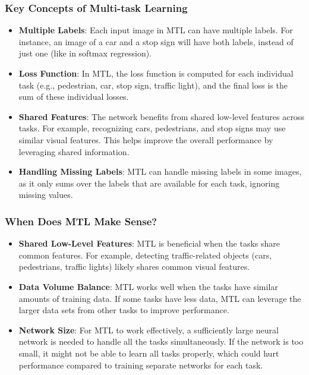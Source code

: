 \documentclass[letterpaper,12pt,notitlepage,twoside]{report}
\begin{document}
\subsubsection*{Key Concepts of Multi-task Learning}
\begin{itemize}
    \item \textbf{Multiple Labels}: Each input image in MTL can have multiple labels. For instance, an image of a car and a stop sign will have both labels, instead of just one (like in softmax regression).
    \item \textbf{Loss Function}: In MTL, the loss function is computed for each individual task (e.g., pedestrian, car, stop sign, traffic light), and the final loss is the sum of these individual losses.
    \item \textbf{Shared Features}: The network benefits from shared low-level features across tasks. For example, recognizing cars, pedestrians, and stop signs may use similar visual features. This helps improve the overall performance by leveraging shared information.
    \item \textbf{Handling Missing Labels}: MTL can handle missing labels in some images, as it only sums over the labels that are available for each task, ignoring missing values.
\end{itemize}

\subsubsection*{When Does MTL Make Sense?}
\begin{itemize}[nosep]
    \item \textbf{Shared Low-Level Features}: MTL is beneficial when the tasks share common features. For example, detecting traffic-related objects (cars, pedestrians, traffic lights) likely shares common visual features.
    \item \textbf{Data Volume Balance}: MTL works well when the tasks have similar amounts of training data. If some tasks have less data, MTL can leverage the larger data sets from other tasks to improve performance.
    \item \textbf{Network Size}: For MTL to work effectively, a sufficiently large neural network is needed to handle all the tasks simultaneously. If the network is too small, it might not be able to learn all tasks properly, which could hurt performance compared to training separate networks for each task.
\end{itemize}
\end{document}
